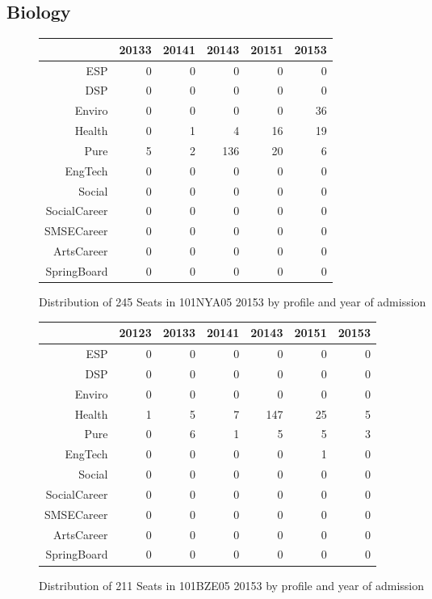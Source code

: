 \documentclass{article}\usepackage[]{graphicx}\usepackage[]{color}
\begin{document}
\subsection{Biology}
\begin{figure}[H]
\centering
\begin{tabular}{rrrrrr}
  \hline
 & 20133 & 20141 & 20143 & 20151 & 20153 \\ 
  \hline
ESP &   0 &   0 &   0 &   0 &   0 \\ 
  DSP &   0 &   0 &   0 &   0 &   0 \\ 
  Enviro &   0 &   0 &   0 &   0 &  36 \\ 
  Health &   0 &   1 &   4 &  16 &  19 \\ 
  Pure &   5 &   2 & 136 &  20 &   6 \\ 
  EngTech &   0 &   0 &   0 &   0 &   0 \\ 
  Social &   0 &   0 &   0 &   0 &   0 \\ 
  SocialCareer &   0 &   0 &   0 &   0 &   0 \\ 
  SMSECareer &   0 &   0 &   0 &   0 &   0 \\ 
  ArtsCareer &   0 &   0 &   0 &   0 &   0 \\ 
  SpringBoard &   0 &   0 &   0 &   0 &   0 \\ 
   \hline
\end{tabular}
\caption{Distribution of 245 Seats in 101NYA05 20153 by profile and year of admission} 
\end{figure}
\begin{figure}[H]
\centering
\begin{tabular}{rrrrrrr}
  \hline
 & 20123 & 20133 & 20141 & 20143 & 20151 & 20153 \\ 
  \hline
ESP &   0 &   0 &   0 &   0 &   0 &   0 \\ 
  DSP &   0 &   0 &   0 &   0 &   0 &   0 \\ 
  Enviro &   0 &   0 &   0 &   0 &   0 &   0 \\ 
  Health &   1 &   5 &   7 & 147 &  25 &   5 \\ 
  Pure &   0 &   6 &   1 &   5 &   5 &   3 \\ 
  EngTech &   0 &   0 &   0 &   0 &   1 &   0 \\ 
  Social &   0 &   0 &   0 &   0 &   0 &   0 \\ 
  SocialCareer &   0 &   0 &   0 &   0 &   0 &   0 \\ 
  SMSECareer &   0 &   0 &   0 &   0 &   0 &   0 \\ 
  ArtsCareer &   0 &   0 &   0 &   0 &   0 &   0 \\ 
  SpringBoard &   0 &   0 &   0 &   0 &   0 &   0 \\ 
   \hline
\end{tabular}
\caption{Distribution of 211 Seats in 101BZE05 20153 by profile and year of admission} 
\end{figure}
\end{document}
